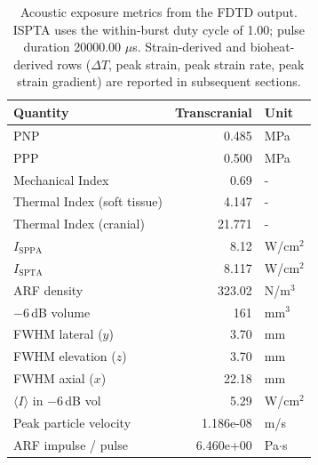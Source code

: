 \documentclass[11pt,letterpaper]{article}
\begin{document}
\begin{table}[h!]
\centering
\scriptsize
\setlength{\tabcolsep}{6pt}
\renewcommand{\arraystretch}{1.05}


\begin{tabular}{l r  l}
\toprule
\textbf{Quantity} & \textbf{Transcranial}  & \textbf{Unit} \\
\midrule
PNP                                  & 0.485        & MPa \\
PPP                                  & 0.500        & MPa \\
Mechanical Index                     & 0.69             & - \\
Thermal Index (soft tissue)          & 4.147        & - \\
Thermal Index (cranial)              & 21.771     & - \\
$I_{\mathrm{SPPA}}$                  & 8.12    & W/cm$^2$ \\
$I_{\mathrm{SPTA}}$                  & 8.117    & W/cm$^2$ \\
ARF density                          & 323.02   & N/m$^3$ \\
$-6$\,dB volume                      & 161 & mm$^3$ \\
FWHM lateral ($y$)                   & 3.70      & mm \\
FWHM elevation ($z$)                 & 3.70      & mm \\
FWHM axial ($x$)                     & 22.18      & mm \\
$\langle I \rangle$ in $-6$\,dB vol  & 5.29   & W/cm$^2$ \\
Peak particle velocity               & 1.186e-08 & m/s \\
ARF impulse / pulse                  & 6.460e+00 & Pa$\cdot$s \\
\bottomrule
\end{tabular}
\caption{Acoustic exposure metrics from the FDTD output.  ISPTA uses the within-burst duty cycle of 1.00; pulse duration 20000.00 $\mu$s.  Strain-derived and bioheat-derived rows ($\Delta T$, peak strain, peak strain rate, peak strain gradient) are reported in subsequent sections.}
\label{tab:acoustic_outputs}
\end{table}
\end{document}
